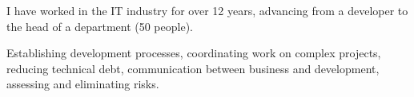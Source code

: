 
\begin{cvparagraph}
    I have worked in the IT industry for over 12 years, advancing from a developer to the head of a department (50 people).

    Establishing development processes, coordinating work on complex projects, reducing technical debt, communication between business and development, assessing and eliminating risks.
\end{cvparagraph}